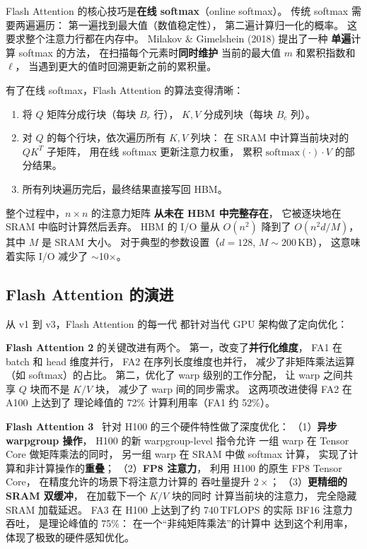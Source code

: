 Flash Attention 的核心技巧是\textbf{在线 softmax}（online softmax）。
传统 softmax 需要两遍遍历：
第一遍找到最大值（数值稳定性），
第二遍计算归一化的概率。
这要求整个注意力行都在内存中。
Milakov \& Gimelshein (2018) 提出了一种
\textbf{单遍}计算 softmax 的方法，
在扫描每个元素时\textbf{同时维护}
当前的最大值 $m$ 和累积指数和 $\ell$，
当遇到更大的值时回溯更新之前的累积量。

有了在线 softmax，Flash Attention 的算法变得清晰：
\begin{enumerate}[noitemsep]
  \item 将 $Q$ 矩阵分成行块（每块 $B_r$ 行），
        $K, V$ 分成列块（每块 $B_c$ 列）。
  \item 对 $Q$ 的每个行块，依次遍历所有 $K, V$ 列块：
        在 SRAM 中计算当前块对的 $QK^T$ 子矩阵，
        用在线 softmax 更新注意力权重，
        累积 $\text{softmax}(\cdot) \cdot V$ 的部分结果。
  \item 所有列块遍历完后，最终结果直接写回 HBM。
\end{enumerate}
整个过程中，$n \times n$ 的注意力矩阵
\textbf{从未在 HBM 中完整存在}，
它被逐块地在 SRAM 中临时计算然后丢弃。
HBM 的 I/O 量从 $O(n^2)$ 降到了 $O(n^2 d / M)$，
其中 $M$ 是 SRAM 大小。
对于典型的参数设置（$d = 128$, $M \sim 200$\,KB），
这意味着实际 I/O 减少了 $\sim$10$\times$。

\subsection{Flash Attention 的演进}

从 v1 到 v3，Flash Attention 的每一代
都针对当代 GPU 架构做了定向优化：

\textbf{Flash Attention 2} 的关键改进有两个。
第一，改变了\textbf{并行化维度}，
FA1 在 batch 和 head 维度并行，
FA2 在序列长度维度也并行，
减少了非矩阵乘法运算（如 softmax）的占比。
第二，优化了 warp 级别的工作分配，
让 warp 之间共享 $Q$ 块而不是 $K/V$ 块，
减少了 warp 间的同步需求。
这两项改进使得 FA2 在 A100 上达到了
理论峰值的 72\% 计算利用率（FA1 约 52\%）。

\textbf{Flash Attention 3}~\cite{shah2024flashattention3}
针对 H100 的三个硬件特性做了深度优化：
（1）\textbf{异步 warpgroup 操作}，
H100 的新 warpgroup-level 指令允许
一组 warp 在 Tensor Core 做矩阵乘法的同时，
另一组 warp 在 SRAM 中做 softmax 计算，
实现了计算和非计算操作的\textbf{重叠}；
（2）\textbf{FP8 注意力}，
利用 H100 的原生 FP8 Tensor Core，
在精度允许的场景下将注意力计算的
吞吐量提升 $2\times$；
（3）\textbf{更精细的 SRAM 双缓冲}，
在加载下一个 $K/V$ 块的同时
计算当前块的注意力，
完全隐藏 SRAM 加载延迟。
FA3 在 H100 上达到了约 740\,TFLOPS 的实际 BF16 注意力吞吐，
是理论峰值的 75\%：
在一个“非纯矩阵乘法”的计算中
达到这个利用率，体现了极致的硬件感知优化。


